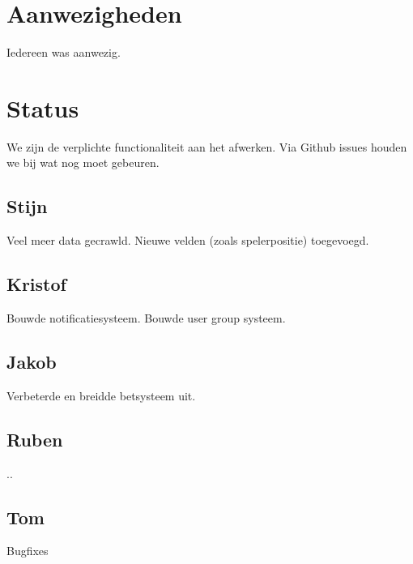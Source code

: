 \documentclass[11pt, a4paper]{article}
\begin{document}
\title{}
\author{Groep A}
\date{14 mei 2014}
\maketitle

\section{Aanwezigheden}
Iedereen was aanwezig.
\section{Status}
We zijn de verplichte functionaliteit aan het afwerken. Via Github issues houden we bij wat nog moet gebeuren.
\subsection{Stijn}
Veel meer data gecrawld. Nieuwe velden (zoals spelerpositie) toegevoegd.
\subsection{Kristof}
Bouwde notificatiesysteem. Bouwde user group systeem.
\subsection{Jakob}
Verbeterde en breidde betsysteem uit.
\subsection{Ruben}
..
\subsection{Tom}
Bugfixes
\end{document}
